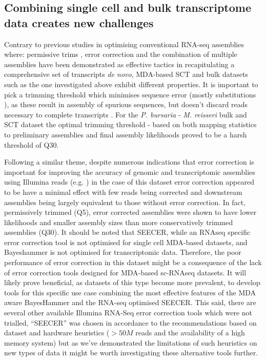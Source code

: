 \subsection{Combining single cell and bulk transcriptome data creates new challenges}

Contrary to previous studies in optimising conventional RNA-seq assemblies where:
permissive trims \citep{Macmanes2014}, error correction \citep{Macmanes2013,Macmanes2015} and the combination of multiple assemblies
\citep{Nakasugi2014} have been demonstrated as effective tactics in recapitulating a comprehensive
set of transcripts \textit{de novo}, MDA-based SCT and bulk datasets such as the one investigated
above exhibit different properties.  
It is important to pick a trimming threshold which minimises sequence error (mostly substitutions \citep{Yang2013}),
as these result in assembly of spurious sequences, but doesn't discard reads necessary to complete transcripts \citep{Macmanes2013,Macmanes2014}. 
For the \textit{P. bursaria} - \textit{M. reisseri} bulk and SCT dataset the optimal trimming threshold - based on both
mapping statistics to preliminary assemblies and final assembly likelihoods proved to be a harsh threshold of Q30. 

Following a similar theme, despite numerous indications that error correction is important for improving the accuracy
of genomic and transcriptomic assemblies using Illumina reads (e.g. \citep{Molnar2014,Macmanes2015}) 
in the case of this dataset error correction appeared to be have a minimal effect with few
reads being corrected and downstream assemblies being largely equivalent to those
without error correction.  In fact, permissively trimmed (Q5), error corrected assemblies 
were shown to have lower likelihoods and smaller assembly sizes
than more conservatively trimmed assemblies (Q30).
It should be noted that SEECER, while an RNAseq specific error correction tool is not
optimised for single cell MDA-based datasets, and Bayeshammer is not optimised
for transcriptomic data.  Therefore, the poor performance of error correction
in this dataset might be a consequence of the lack of error correction tools
designed for MDA-based sc-RNAseq datasets. It will likely prove beneficial, as 
datasets of this type become more prevalent, to develop tools for this specific
use case combining the most effective features of the MDA aware BayesHammer 
and the RNA-seq optimised SEECER.  This said, there are several other available 
Illumina RNA-Seq error correction tools 
which were not trialled, ``SEECER'' was chosen in accordance to the recommendations based on dataset and hardware
heuristics (\(>50M\) reads and the availability of a high memory system) \citep{Macmanes2015} but
as we've demonstrated the limitations of such heuristics on new types of data it might 
be worth investigating these alternative tools further.

